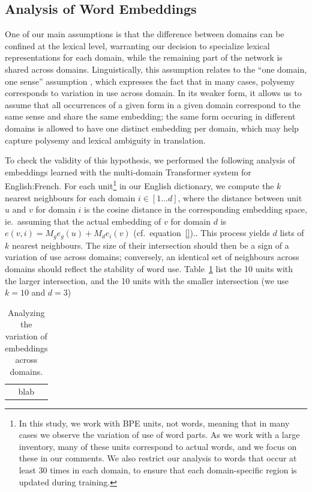 \documentclass[11pt,a4paper]{article}
\newcommand{\fyTodo}[1]{\Todo[FY:]{\textcolor{orange}{#1}}}
\begin{document}
\subsection{Analysis of Word Embeddings \label{ssec:word_embeddings}}
One of our main assumptions is that the difference between domains can be confined at the lexical level, warranting our decision to specialize lexical representations for each domain, while the remaining part of the network is shared across domains. Linguistically, this assumption relates to the ``one domain, one sense'' assumption \fyTodo{Refs}, which expresses the fact that in many cases, polysemy corresponds to variation in use across domain. In its weaker form, it allows us to assume that all occurrences of a given form in a given domain correspond to the same sense and share the same embedding; the same form occuring in different domains is allowed to have one distinct embedding per domain, which may help capture polysemy and lexical ambiguity in translation. 

To check the validity of this hypothesis, we performed the following analysis of embeddings learned with the multi-domain Transformer system for English:French. For each unit\footnote{In this study, we work with BPE units, not words, meaning that in many cases we observe the variation of use of word parts. As we work with a large inventory, many of these units correspond to actual words, and we focus on these in our comments. We also restrict our analysis to words that occur at least 30 times in each domain, to ensure that each domain-specific region is updated during training.} in our English dictionary, we compute the $k$ nearest neighbours for each domain $i \in [1\dots{}d]$, where the distance between unit $u$ and $v$ for domain $i$ is the cosine distance in the corresponding embedding space, ie.\ assuming that the actual embedding of $v$ for domain $d$ is $e(v,i) = M_ge_g(u) + M_de_i(v)$ (cf.\ equation~\eqref{}).\fyTodo{Equation}. This process yields $d$ lists of $k$ nearest neighbours. The size of their intersection should then be a sign of a variation of use across domains; conversely, an identical set of neighbours across domains should reflect the stability of word use. Table~\ref{tab:embeddings} list the 10 units with the larger intersection, and the 10 units with the smaller intersection (we use $k=10$ and $d=3$) 

\begin{table}
  \centering
  \begin{tabularx}{1.0\linewidth}{c}
    blab
  \end{tabularx}
  \caption{Analyzing the variation of embeddings across domains.}
  \label{tab:embeddings}
\end{table}
\end{document}
